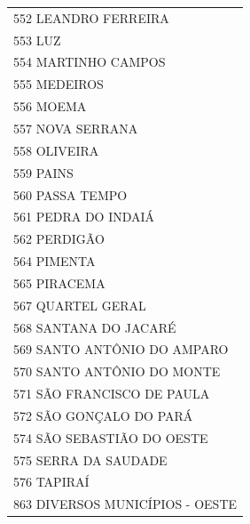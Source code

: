 \documentclass{article}
\begin{document}
\begin{longtable}[c]{m{18cm}}
\multicolumn{1}{l}{ \hspace{2em} 552 LEANDRO FERREIRA } \\
\multicolumn{1}{l}{ \hspace{2em} 553 LUZ } \\
\multicolumn{1}{l}{ \hspace{2em} 554 MARTINHO CAMPOS } \\
\multicolumn{1}{l}{ \hspace{2em} 555 MEDEIROS } \\
\multicolumn{1}{l}{ \hspace{2em} 556 MOEMA } \\
\multicolumn{1}{l}{ \hspace{2em} 557 NOVA SERRANA } \\
\multicolumn{1}{l}{ \hspace{2em} 558 OLIVEIRA } \\
\multicolumn{1}{l}{ \hspace{2em} 559 PAINS } \\
\multicolumn{1}{l}{ \hspace{2em} 560 PASSA TEMPO } \\
\multicolumn{1}{l}{ \hspace{2em} 561 PEDRA DO INDAIÁ } \\
\multicolumn{1}{l}{ \hspace{2em} 562 PERDIGÃO } \\
\multicolumn{1}{l}{ \hspace{2em} 564 PIMENTA } \\
\multicolumn{1}{l}{ \hspace{2em} 565 PIRACEMA } \\
\multicolumn{1}{l}{ \hspace{2em} 567 QUARTEL GERAL } \\
\multicolumn{1}{l}{ \hspace{2em} 568 SANTANA DO JACARÉ } \\
\multicolumn{1}{l}{ \hspace{2em} 569 SANTO ANTÔNIO DO AMPARO } \\
\multicolumn{1}{l}{ \hspace{2em} 570 SANTO ANTÔNIO DO MONTE } \\
\multicolumn{1}{l}{ \hspace{2em} 571 SÃO FRANCISCO DE PAULA } \\
\multicolumn{1}{l}{ \hspace{2em} 572 SÃO GONÇALO DO PARÁ } \\
\multicolumn{1}{l}{ \hspace{2em} 574 SÃO SEBASTIÃO DO OESTE } \\
\multicolumn{1}{l}{ \hspace{2em} 575 SERRA DA SAUDADE } \\
\multicolumn{1}{l}{ \hspace{2em} 576 TAPIRAÍ } \\
\multicolumn{1}{l}{ \hspace{2em} 863 DIVERSOS MUNICÍPIOS - OESTE } \\
\end{longtable}
\end{document}
